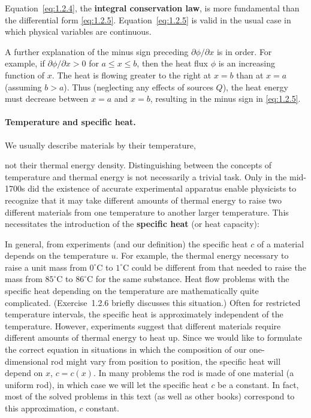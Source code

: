 Equation~\eqref{eq:1.2.4}, the \textbf{integral conservation law}, is more fundamental than the differential form \eqref{eq:1.2.5}. Equation~\eqref{eq:1.2.5} is valid in the usual case in which physical variables are continuous.

A further explanation of the minus sign preceding $\partial\phi/\partial x$ is in order. For example, if $\partial\phi/\partial x > 0$ for $a \le x \le b$, then the heat flux $\phi$ is an increasing function of $x$. The heat is flowing greater to the right at $x = b$ than at $x = a$ (assuming $b > a$). Thus (neglecting any effects of sources $Q$), the heat energy must decrease between $x = a$ and $x = b$, resulting in the minus sign in \eqref{eq:1.2.5}.

\paragraph{Temperature and specific heat.}
We usually describe materials by their temperature,
\begin{center}
\end{center}

\noindent not their thermal energy density. Distinguishing between the concepts of temperature and thermal energy is not necessarily a trivial task. Only in the mid-1700s did the existence of accurate experimental apparatus enable physicists to recognize that it may take different amounts of thermal energy to raise two different materials from one temperature to another larger temperature. This necessitates the introduction of the \textbf{specific heat} (or heat capacity):

\begin{center}
\end{center}

In general, from experiments (and our definition) the specific heat $c$ of a material depends on the temperature $u$. For example, the thermal energy necessary to raise a unit mass from $0^\circ$C to $1^\circ$C could be different from that needed to raise the mass from $85^\circ$C to $86^\circ$C for the same substance. Heat flow problems with the specific heat depending on the temperature are mathematically quite complicated. (Exercise~1.2.6 briefly discusses this situation.) Often for restricted temperature intervals, the specific heat is approximately independent of the temperature. However, experiments suggest that different materials require different amounts of thermal energy to heat up. Since we would like to formulate the correct equation in situations in which the composition of our one-dimensional rod might vary from position to position, the specific heat will depend on $x$, $c = c(x)$. In many problems the rod is made of one material (a uniform rod), in which case we will let the specific heat $c$ be a constant. In fact, most of the solved problems in this text (as well as other books) correspond to this approximation, $c$ constant.

